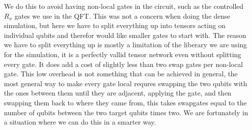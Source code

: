 \noindent
We do this to avoid having non-local gates in the circuit, such as the controlled $R_x$ gates we use in the QFT. This was not a concern when doing the dense simulation, but here we have to split everything up into tensors acting on individual qubits and therefor would like smaller gates to start with. The reason we have to split everything up is mostly a limitation of the liberary we are using for the simulation, it is a perfectly vallid tensor network even without splitting every gate. It does add a cost of slightly less than two swap gates per non-local gate. 
This low overhead is not something that can be achieved in general, the most general way to make every gate local requres swapping the two qubits with the ones between them until they are adjacent, applying the gate, and then swapping them back to where they came from, this takes swapgates equal to the number of qubits between the two target qubits times two. We are fortunately in a situation where we can do this in a smarter way. 

